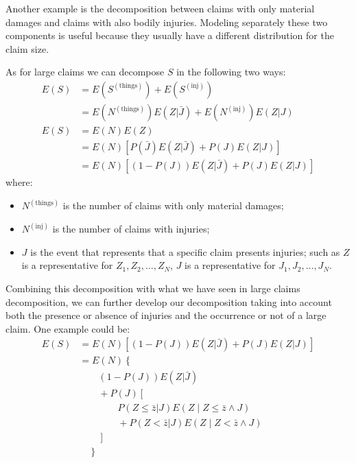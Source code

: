 \documentclass[a4paper, twoside, openright, 12pt]{report}
\providecommand{\tightlist}{%
  \setlength{\itemsep}{0pt}\setlength{\parskip}{0pt}}
\theoremstyle{definition}
\theoremstyle{definition}
\theoremstyle{definition}
\theoremstyle{remark}
\begin{document}
Another example is the decomposition between claims with only material damages and claims with also bodily injuries. Modeling separately these two components is useful because they usually have a different distribution for the claim size.

As for large claims we can decompose \(S\) in the following two ways:
\begin{align}
  \nonumber
  E(S) & = E(S^{(\text{things})}) + E(S^{(\text{inj})}) \\
    \label{inj-claim-decomposition-expected-1}
    & = E(N^{(\text{things})}) E(Z|\bar{J}) + E(N^{(\text{inj})}) E(Z|J) \\[12pt]
  \nonumber
  E(S) & = E(N) E(Z) \\
    \nonumber
    & = E(N) \left[P(\bar{J}) E(Z|\bar{J}) + P(J) E(Z|J) \right] \\
    \label{inj-claim-decomposition-expected-2}
    & = E(N) \left[\left( 1 - P(J) \right) E(Z|\bar{J}) + P(J) E(Z|J)\right]
\end{align}
where:

\begin{itemize}
\tightlist
\item
  \(N^{(\text{things})}\) is the number of claims with only material damages;
\item
  \(N^{(\text{inj})}\) is the number of claims with injuries;
\item
  \(J\) is the event that represents that a specific claim presents injuries; such as \(Z\) is a representative for \(Z_1, Z_2, \dots, Z_N\), \(J\) is a representative for \(J_1, J_2, \dots, J_N\).
\end{itemize}

Combining this decomposition with what we have seen in large claims decomposition, we can further develop our decomposition taking into account both the presence or absence of injuries and the occurrence or not of a large claim. One example could be:
\begin{align*}
E(S) & = E(N) \left[\left( 1 - P(J) \right) E(Z|\bar{J}) + P(J) E(Z|J) \right] \\[4pt]
  & = E(N) \left\{ \right. \\
  & \qquad \left( 1 - P(J) \right) E(Z|\bar{J}) \\
  & \qquad + P(J) \left[ \right. \\
  & \qquad \qquad P(Z \le \bar{z} | J) E\left( Z \mid Z\le \bar{z} \land J \right) \\
  & \qquad \qquad + P(Z < \bar{z} | J) E\left( Z \mid Z < \bar{z} \land J \right) \\
  & \qquad \left. \right] \\
  & \quad \left. \right\}
\end{align*}
\end{document}
